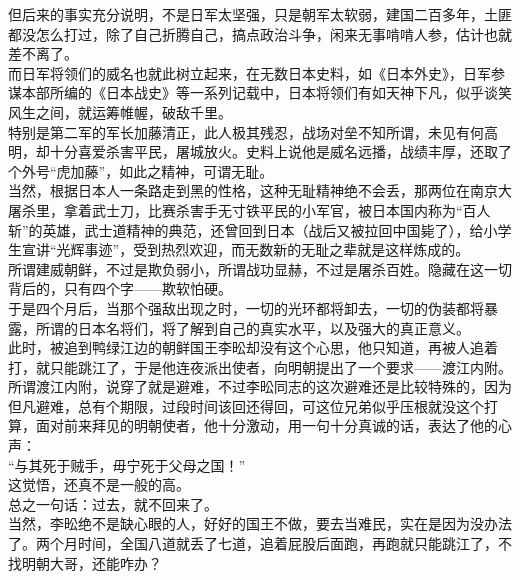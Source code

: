 \begin{multicols}{\theparacolNo}
但后来的事实充分说明，不是日军太坚强，只是朝军太软弱，建国二百多年，土匪都没怎么打过，除了自己折腾自己，搞点政治斗争，闲来无事啃啃人参，估计也就差不离了。\\

而日军将领们的威名也就此树立起来，在无数日本史料，如《日本外史》，日军参谋本部所编的《日本战史》等一系列记载中，日本将领们有如天神下凡，似乎谈笑风生之间，就运筹帷幄，破敌千里。\\

特别是第二军的军长加藤清正，此人极其残忍，战场对垒不知所谓，未见有何高明，却十分喜爱杀害平民，屠城放火。史料上说他是威名远播，战绩丰厚，还取了个外号“虎加藤”，如此之精神，可谓无耻。\\

当然，根据日本人一条路走到黑的性格，这种无耻精神绝不会丢，那两位在南京大屠杀里，拿着武士刀，比赛杀害手无寸铁平民的小军官，被日本国内称为“百人斩”的英雄，武士道精神的典范，还曾回到日本（战后又被拉回中国毙了），给小学生宣讲“光辉事迹”，受到热烈欢迎，而无数新的无耻之辈就是这样炼成的。\\

所谓建威朝鲜，不过是欺负弱小，所谓战功显赫，不过是屠杀百姓。隐藏在这一切背后的，只有四个字——欺软怕硬。\\

于是四个月后，当那个强敌出现之时，一切的光环都将卸去，一切的伪装都将暴露，所谓的日本名将们，将了解到自己的真实水平，以及强大的真正意义。\\

此时，被追到鸭绿江边的朝鲜国王李昖却没有这个心思，他只知道，再被人追着打，就只能跳江了，于是他连夜派出使者，向明朝提出了一个要求——渡江内附。\\

所谓渡江内附，说穿了就是避难，不过李昖同志的这次避难还是比较特殊的，因为但凡避难，总有个期限，过段时间该回还得回，可这位兄弟似乎压根就没这个打算，面对前来拜见的明朝使者，他十分激动，用一句十分真诚的话，表达了他的心声：\\

“与其死于贼手，毋宁死于父母之国！”\\

这觉悟，还真不是一般的高。\\

总之一句话：过去，就不回来了。\\

当然，李昖绝不是缺心眼的人，好好的国王不做，要去当难民，实在是因为没办法了。两个月时间，全国八道就丢了七道，追着屁股后面跑，再跑就只能跳江了，不找明朝大哥，还能咋办？\\


\end{multicols}
